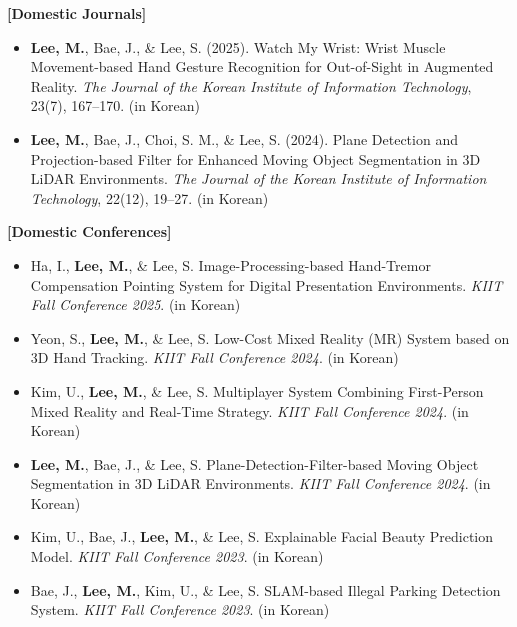 \documentclass[letterpaper,11pt]{article}
\newcommand{\resumeItem}[1]{
  \item\small{
    {#1 \vspace{0pt}}
  }
}
\newcommand{\resumeSubHeadingListStart}{\begin{itemize}[leftmargin=*]}
\newcommand{\resumeSubHeadingListEnd}{\end{itemize}}
\begin{document}
\textbf{[Domestic Journals]}
\resumeSubHeadingListStart
\resumeItem{\textbf{Lee, M.}, Bae, J., \& Lee, S. (2025). Watch My Wrist: Wrist Muscle Movement-based Hand Gesture Recognition for Out-of-Sight in Augmented Reality. \textit{The Journal of the Korean Institute of Information Technology}, 23(7), 167--170. (in Korean)}
\resumeItem{\textbf{Lee, M.}, Bae, J., Choi, S. M., \& Lee, S. (2024). Plane Detection and Projection-based Filter for Enhanced Moving Object Segmentation in 3D LiDAR Environments. \textit{The Journal of the Korean Institute of Information Technology}, 22(12), 19--27. (in Korean)}
\resumeSubHeadingListEnd

\textbf{[Domestic Conferences]}
\resumeSubHeadingListStart
\resumeItem{Ha, I., \textbf{Lee, M.}, \& Lee, S. Image-Processing-based Hand-Tremor Compensation Pointing System for Digital Presentation Environments. \textit{KIIT Fall Conference 2025}. (in Korean)}
\resumeItem{Yeon, S., \textbf{Lee, M.}, \& Lee, S. Low-Cost Mixed Reality (MR) System based on 3D Hand Tracking. \textit{KIIT Fall Conference 2024}. (in Korean)}
\resumeItem{Kim, U., \textbf{Lee, M.}, \& Lee, S. Multiplayer System Combining First-Person Mixed Reality and Real-Time Strategy. \textit{KIIT Fall Conference 2024}. (in Korean)}
\resumeItem{\textbf{Lee, M.}, Bae, J., \& Lee, S. Plane-Detection-Filter-based Moving Object Segmentation in 3D LiDAR Environments. \textit{KIIT Fall Conference 2024}. (in Korean)}
\resumeItem{Kim, U., Bae, J., \textbf{Lee, M.}, \& Lee, S. Explainable Facial Beauty Prediction Model. \textit{KIIT Fall Conference 2023}. (in Korean)}
\resumeItem{Bae, J., \textbf{Lee, M.}, Kim, U., \& Lee, S. SLAM-based Illegal Parking Detection System. \textit{KIIT Fall Conference 2023}. (in Korean)}
\resumeSubHeadingListEnd

\end{document}
